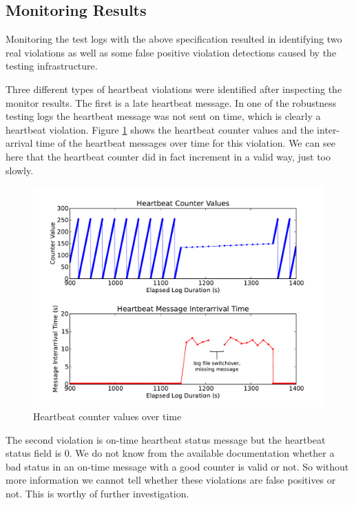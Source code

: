 \subsection{Monitoring Results}
Monitoring the test logs with the above specification resulted in identifying two real violations as well as some false positive violation detections caused by the testing infrastructure.

Three different types of heartbeat violations were identified after inspecting the monitor results.
The first is a late heartbeat message. In one of the robustness testing logs the heartbeat message was not sent on time, which is clearly a heartbeat violation. Figure \ref{fig:hb_arrival} shows the heartbeat counter values and the inter-arrival time of the heartbeat messages over time for this violation. We can see here that the heartbeat counter did in fact increment in a valid way, just too slowly. 

\begin{figure}
		\includegraphics[width=4.5in]{img/hb1}
		\caption{Heartbeat counter values over time}
		\label{fig:hb_arrival}
\end{figure}

The second violation is on-time heartbeat status message but the heartbeat status field is 0. 
We do not know from the available documentation whether a bad status in an on-time message with a good counter is valid or not. So without more information we cannot tell whether these violations are false positives or not. This is worthy of further investigation.

